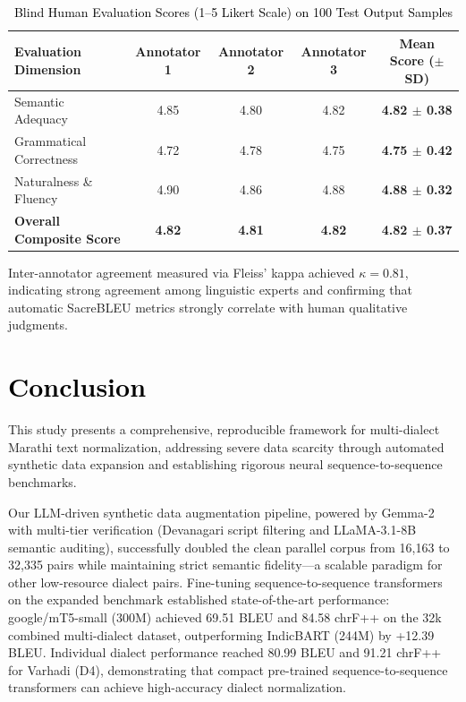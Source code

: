 \begin{table}[t]
\color{black}
\centering
\caption{\textcolor{black}{Blind Human Evaluation Scores (1--5 Likert Scale) on 100 Test Output Samples}}
\label{tab:human_eval}
\begin{tabular}{lcccc}
\hline
\textbf{Evaluation Dimension} & \textbf{Annotator 1} & \textbf{Annotator 2} & \textbf{Annotator 3} & \textbf{Mean Score ($\pm$ SD)} \\
\hline
Semantic Adequacy & 4.85 & 4.80 & 4.82 & \textbf{4.82 $\pm$ 0.38} \\
Grammatical Correctness & 4.72 & 4.78 & 4.75 & \textbf{4.75 $\pm$ 0.42} \\
Naturalness \& Fluency & 4.90 & 4.86 & 4.88 & \textbf{4.88 $\pm$ 0.32} \\
\hline
\textbf{Overall Composite Score} & \textbf{4.82} & \textbf{4.81} & \textbf{4.82} & \textbf{4.82 $\pm$ 0.37} \\
\hline
\end{tabular}
\end{table}

Inter-annotator agreement measured via Fleiss' kappa achieved $\kappa = 0.81$, indicating strong agreement among linguistic experts and confirming that automatic SacreBLEU metrics strongly correlate with human qualitative judgments.

\section{\textcolor{black}{Conclusion}}
\label{sec:conclusion}

This study presents a comprehensive, reproducible framework for multi-dialect Marathi text normalization, addressing severe data scarcity through automated synthetic data expansion and establishing rigorous neural sequence-to-sequence benchmarks.

Our LLM-driven synthetic data augmentation pipeline, powered by Gemma-2 with multi-tier verification (Devanagari script filtering and LLaMA-3.1-8B semantic auditing), successfully doubled the clean parallel corpus from 16,163 to 32,335 pairs while maintaining strict semantic fidelity---a scalable paradigm for other low-resource dialect pairs. Fine-tuning sequence-to-sequence transformers on the expanded benchmark established state-of-the-art performance: google/mT5-small (300M) achieved 69.51 BLEU and 84.58 chrF++ on the 32k combined multi-dialect dataset, outperforming IndicBART (244M) by +12.39 BLEU. Individual dialect performance reached 80.99 BLEU and 91.21 chrF++ for Varhadi (D4), demonstrating that compact pre-trained sequence-to-sequence transformers can achieve high-accuracy dialect normalization.

